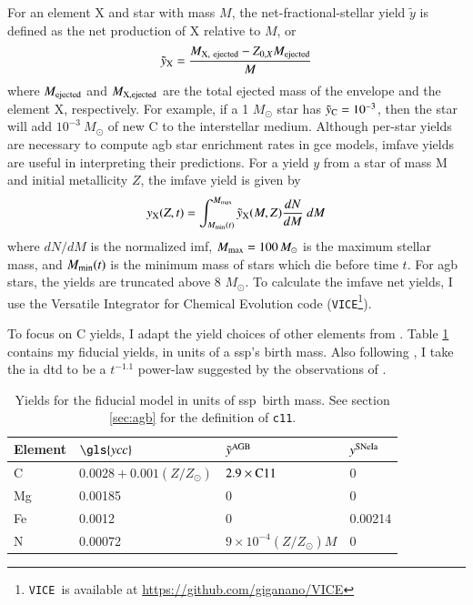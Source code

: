 \documentclass[12pt,oneside,letterpaper]{report}
\newcommand{\agb}{\gls{agb}}
\newcommand{\ia}{\gls{ia}}
\newcommand{\ssp}{\gls{ssp}}
\newcommand{\imf}{\gls{imf}}
\newcommand{\gce}{\gls{gce}}
\newcommand{\cxi}{\texttt{\gls{c11}}}
\newcommand{\Ycc}{\gls{ycc}}
\newcommand{\VICE}{\texttt{VICE}}
\begin{document}
For an element X and star with mass $M$, the net-fractional-stellar yield $\tilde{y}$ is defined as the net production of X relative to $M$, or
\begin{equation}
    \tilde{y}_{\rm X} = \frac{M_{\rm X,\ ejected} - Z_{0, X} M_{\rm ejected}}{M}   
\end{equation}
where $M_{\rm ejected}$ and $M_{\rm X, ejected}$  are the total ejected mass of the envelope and the element X, respectively. For example, if a 1 $M_\odot$ star has $\tilde{y}_{\rm C} = 10^{-3}$, then the star will add $10^{-3}\ M_\odot$ of new C to the interstellar medium. 
Although per-star yields are necessary to compute \agb{} star enrichment rates in \gce{}  models, \gls{imfave} yields are useful in interpreting their predictions. For a yield $y$ from a star of mass M and initial metallicity $Z$, the \gls{imfave} yield is given by 
\begin{equation} \label{eq:imf-yield}
    y_{\rm X}(Z,t) = 
    \int_{M_{\rm min}(t)}^{M_{\rm max}} 
    \tilde{y}_{\rm X}(M, Z)
    \frac{dN}{dM}  \ dM
\end{equation}
where ${dN}/{dM}$ is the normalized \imf, $M_{\rm max}=100\,M_\odot$ is the maximum stellar mass, and $M_{\rm min}(t)$ is the minimum mass of stars which die before time $t$. For \agb{} stars, the yields are truncated above 8 $M_{\odot}$. 
To calculate the \gls{imfave} net yields, I use the Versatile Integrator for Chemical Evolution code (\VICE\footnote{\VICE~is available at \url{https://github.com/giganano/VICE}}).

To focus on C yields, I adapt the yield choices of other elements from \citet{james+21, james+23}.
Table \ref{tab:fiducial_mod} contains my fiducial yields, in units of a \ssp's birth mass.
Also following \citet{james+21, james+23}, I take the \ia{} \gls{dtd} to be a
$t^{-1.1}$ power-law suggested by the observations of \citet{maoz+12}.


\begin{table}
	\centering
    \caption[Fiducial Model]{Yields for the fiducial model in units of \ssp~birth mass. See section \ref{sec:agb} for the definition of \cxi.}
	\label{tab:fiducial_mod}

	\begin{tabular}{l l l l}
		\toprule
        Element & $\Ycc$ & $\tilde{y}^{\rm AGB}$ & $y^{\rm SNe Ia}$ \\
		\midrule
        C & $0.0028 + 0.001(Z/Z_\odot)$ & $2.9\times{\rm C11}$ &  0 \\
        Mg & 0.00185 & 0 & 0 \\
        Fe & 0.0012 & 0 & 0.00214 \\
        N & 0.00072 & $9\times10^{-4}(Z/Z_\odot)M$ & 0\\
		\bottomrule
	\end{tabular}
\end{table}
\end{document}
